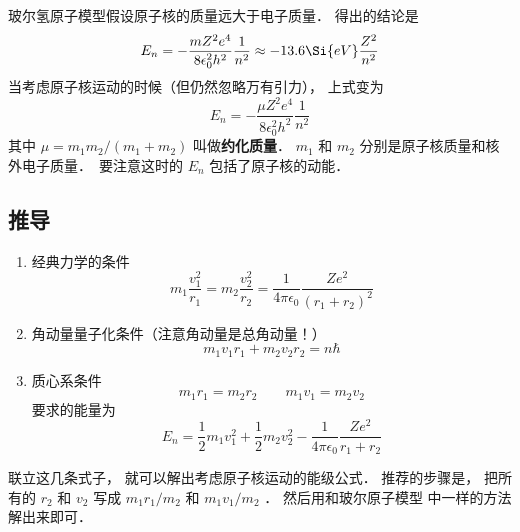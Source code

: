 
玻尔氢原子模型假设原子核的质量远大于电子质量． 得出的结论是
\begin{equation}
E_n = -\frac{mZ^2 e^4}{8\epsilon_0^2 h^2}\frac{1}{n^2} \approx  - 13.6\Si{eV} \frac{Z^2}{n^2}
\end{equation}
当考虑原子核运动的时候（但仍然忽略万有引力）， 上式变为
\begin{equation}\label{HRMass_eq1}
E_n = -\frac{\mu Z^2 e^4}{8\epsilon_0^2 h^2} \frac{1}{n^2}
\end{equation}
其中 $\mu  = m_1 m_2/(m_1 + m_2)$ 叫做\textbf{约化质量}． $m_1$ 和 $m_2$ 分别是原子核质量和核外电子质量．　要注意这时的 $E_n$ 包括了原子核的动能．
\subsection{推导}
\begin{enumerate}
\item 经典力学的条件
\begin{equation}
m_1 \frac{v_1^2}{r_1} = m_2 \frac{v_2^2}{r_2} = \frac{1}{4\pi\epsilon_0} \frac{Z e^2}{(r_1 + r_2)^2}
\end{equation}
\item 角动量量子化条件（注意角动量是总角动量！）
\begin{equation}
m_1 v_1 r_1 + m_2 v_2 r_2 = n\hbar 
\end{equation}
\item 质心系条件
\begin{equation}
m_1 r_1 = m_2 r_2 \qquad m_1 v_1 = m_2 v_2
\end{equation}
要求的能量为
\begin{equation}
E_n = \frac12 m_1 v_1^2 + \frac12 m_2 v_2^2 - \frac{1}{4\pi\epsilon_0} \frac{Z e^2}{r_1 + r_2}
\end{equation}
\end{enumerate}
联立这几条式子， 就可以解出考虑原子核运动的能级公式． 推荐的步骤是， 把所有的 $r_2$ 和 $v_2$ 写成 $m_1 r_1/m_2$ 和 $m_1 v_1/m_2$ ． 然后用和玻尔原子模型%
中一样的方法解出来即可．

